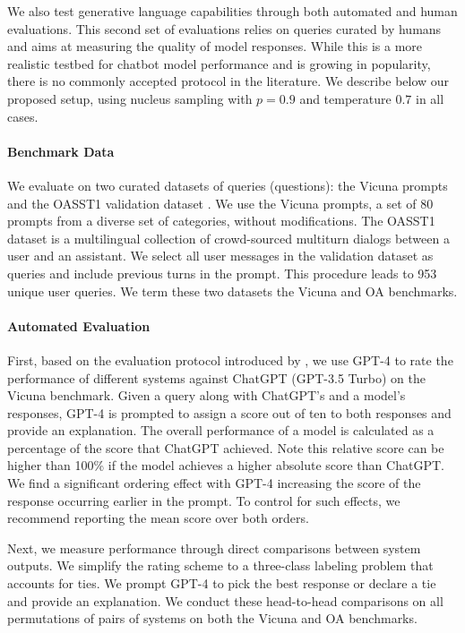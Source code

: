 We also test generative language capabilities through both automated and human evaluations. 
This second set of evaluations relies on queries curated by humans and aims at measuring the quality of model responses. 
While this is a more realistic testbed for chatbot model performance and is growing in popularity, there is no commonly accepted protocol in the literature. We describe below our proposed setup, using nucleus sampling with $p=0.9$ and temperature $0.7$ in all cases.

\paragraph{Benchmark Data} We evaluate on two curated datasets of queries (questions): the Vicuna prompts \citep{vicuna2023} and the OASST1 validation dataset \citep{kopf2023openassistant}. We use the Vicuna prompts, a set of 80 prompts from a diverse set of categories, without modifications. The OASST1 dataset is a multilingual collection of crowd-sourced multiturn dialogs between a user and an assistant. We select all user messages in the validation dataset as queries and include previous turns in the prompt. This procedure leads to 953 unique user queries. We term these two datasets the Vicuna and OA benchmarks.

\paragraph{Automated Evaluation}
First, based on the evaluation protocol introduced by \citet{vicuna2023}, we use GPT-4 to rate the performance of different systems against ChatGPT (GPT-3.5 Turbo) on the Vicuna benchmark. Given a query along with ChatGPT's and a model's responses, GPT-4 is prompted to assign a score out of ten to both responses and provide an explanation. The overall performance of a model is calculated as a percentage of the score that ChatGPT achieved. Note this relative score can be higher than 100\% if the model achieves a higher absolute score than ChatGPT. We find a significant ordering effect with GPT-4 increasing the score of the response occurring earlier in the prompt. To control for such effects, we recommend reporting the mean score over both orders.

Next, we measure performance through direct comparisons between system outputs. We simplify the rating scheme to a three-class labeling problem that accounts for ties. We prompt GPT-4 to pick the best response or declare a tie and provide an explanation. We conduct these head-to-head comparisons on all permutations of pairs of systems on both the Vicuna and OA benchmarks.

